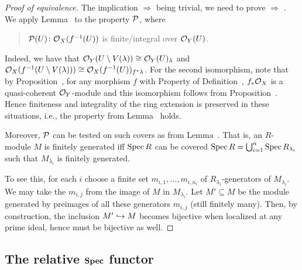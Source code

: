 \documentclass[a4paper,parskip=half,numbers=enddot, DIV=12]{scrreprt}
\begin{document}
\begin{proof}[Proof of equivalence]
	The implication  $\Rightarrow$  being trivial, we need to prove  $\Rightarrow$ . We apply Lemma~ to the property $\mathcal{P}$, where
	\begin{quote}
		$\mathcal{P}(U)\colon\mathcal{O}_X(f^{-1}(U))$ is finite/integral over $\mathcal{O}_Y(U)$.
	\end{quote}
	Indeed, we have that $\mathcal{O}_Y(U\setminus V(\lambda))\cong \mathcal{O}_Y(U)_\lambda$ and $\mathcal{O}_X(f^{-1}(U\setminus V(\lambda))) \cong \mathcal{O}_X(f^{-1}(U))_{f^*\lambda}$. For the second isomorphism, note that by Proposition~, for any morphism $f$ with Property  of Definition~, $f_*\mathcal{O}_X$ is a quasi-coherent $\mathcal{O}_Y$-module and this isomorphism follows from Proposition~. Hence finiteness and integrality of the ring extension is preserved in these situations, i.e., the property from Lemma~\itememph{\alpha} holds. 
	
	Moreover, $\mathcal{P}$ can be tested on such covers as from Lemma~\itememph{\beta}. That is, an $R$-module $M$ is finitely generated iff $\operatorname{Spec} R$ can be covered $\operatorname{Spec} R = \bigcup_{i=1}^n \operatorname{Spec} R_{\lambda_i}$ such that $M_{\lambda_i}$ is finitely generated. 
	
	To see this, for each $i$ choose a finite set $m_{i,1},\ldots,m_{i,n_i}$ of $R_{\lambda_i}$-generators of $M_{\lambda_i}$. We may take the $m_{i,j}$ from the image of $M$ in $M_{\lambda_i}$. Let $M'\subseteq M$ be the module generated by preimages of all these generators $m_{i,j}$ (still finitely many). Then, by construction, the inclusion $M'\monomorphism M$ becomes bijective when localized at any prime ideal, hence must be bijective as well.
\end{proof}
\subsection{The relative \texorpdfstring{$\operatorname{\mathbf{Spec}}$}{Spec} functor}
\end{document}
